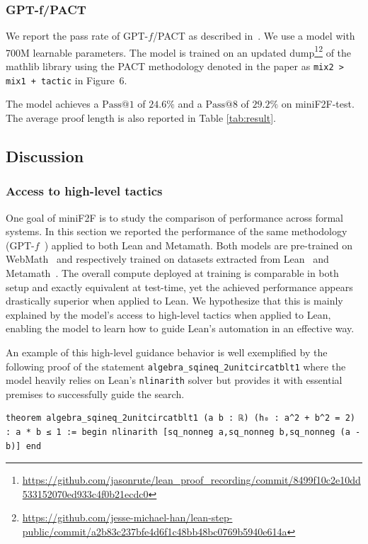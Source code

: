 \subsubsection{GPT-f/PACT}

We report the pass rate of GPT-$f$/PACT as described in~\citet{han2021proof}. We use a model with 700M learnable parameters. The model is trained on an updated dump\footnote{\url{https://github.com/jasonrute/lean_proof_recording/commit/8499f10c2e10dd533152070ed933c4f0b21ecdc0}}\footnote{\url{https://github.com/jesse-michael-han/lean-step-public/commit/a2b83c237bfe4d6f1c48bb48bc0769b5940e614a}} of the mathlib library using the PACT methodology denoted in the paper as \verb$mix2 > mix1 + tactic$ in Figure~6.

The model achieves a $\text{Pass}@1$ of $24.6\%$ and a $\text{Pass}@8$ of $29.2\%$ on \textsf{miniF2F}-test. The average proof length is also reported in Table \ref{tab:result}.

\subsection{Discussion}

\subsubsection{Access to high-level tactics} One goal of \textsf{miniF2F} is to study the comparison of performance across formal systems. In this section we reported the performance of the same methodology (GPT-$f$~\citep{polu2020generative}) applied to both Lean and Metamath. Both models are pre-trained on WebMath~\citep{polu2020generative} and respectively trained on datasets extracted from Lean~\citep{han2021proof} and Metamath~\citep{polu2020generative}. The overall compute deployed at training is comparable in both setup and exactly equivalent at test-time, yet the achieved performance appears drastically superior when applied to Lean. We hypothesize that this is mainly explained by the model's access to high-level tactics when applied to Lean, enabling the model to learn how to guide Lean's automation in an effective way.

An example of this high-level guidance behavior is well exemplified by the following proof of the statement \verb+algebra_sqineq_2unitcircatblt1+ where the model heavily relies on Lean's \verb_nlinarith_ solver but provides it with essential premises to successfully guide the search.

\begin{verbatim}
theorem algebra_sqineq_2unitcircatblt1 (a b : ℝ) (h₀ : a^2 + b^2 = 2) : a * b ≤ 1 := begin nlinarith [sq_nonneg a,sq_nonneg b,sq_nonneg (a - b)] end
\end{verbatim}

